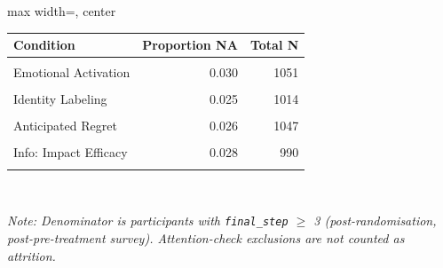 \renewcommand{\arraystretch}{1.2}
\begin{adjustbox}{max width=\linewidth, center}
\begingroup\fontsize{10}{12}\selectfont

\begin{tabular}{lrr}
\toprule
\textbf{Condition} & \textbf{Proportion NA} & \textbf{Total N}\\
\midrule
\cellcolor{gray!15}{Control} & \cellcolor{gray!15}{0.038} & \cellcolor{gray!15}{2046}\\
Emotional Activation & 0.030 & 1051\\
\cellcolor{gray!15}{Implementation Intentions} & \cellcolor{gray!15}{0.029} & \cellcolor{gray!15}{1109}\\
Identity Labeling & 0.025 & 1014\\
\cellcolor{gray!15}{Commitment Escalation} & \cellcolor{gray!15}{0.021} & \cellcolor{gray!15}{1031}\\
Anticipated Regret & 0.026 & 1047\\
\cellcolor{gray!15}{Mega (All Combined)} & \cellcolor{gray!15}{0.022} & \cellcolor{gray!15}{1040}\\
Info: Impact Efficacy & 0.028 & 990\\
\cellcolor{gray!15}{Info: Issue} & \cellcolor{gray!15}{0.035} & \cellcolor{gray!15}{989}\\
\bottomrule
\end{tabular}
\endgroup{}

\end{adjustbox}
\\[3pt]
\begin{minipage}{\linewidth}
\raggedright\footnotesize\textit{Note: Denominator is participants with \texttt{final\_step} $\geq$ 3 (post-randomisation, post-pre-treatment survey). Attention-check exclusions are not counted as attrition.}
\end{minipage}

